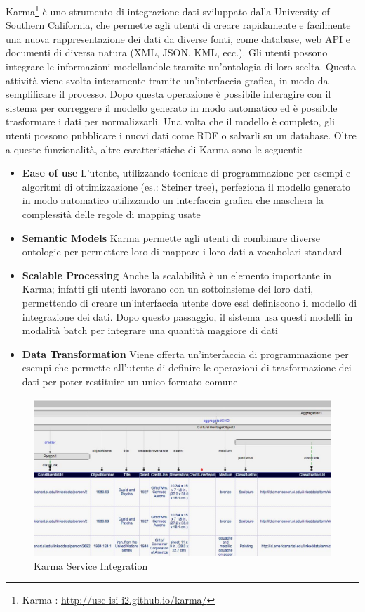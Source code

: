 Karma\footnote{Karma : \url{http://usc-isi-i2.github.io/karma/}} è uno strumento di integrazione dati sviluppato dalla University of Southern California, che permette agli utenti di creare rapidamente e facilmente una nuova rappresentazione dei dati  da diverse fonti, come database, web API e documenti di diversa natura (XML, JSON, KML, ecc.). Gli utenti possono integrare le informazioni modellandole tramite un'ontologia di loro scelta. Questa attività viene svolta interamente tramite un'interfaccia grafica, in modo da semplificare il processo. 
Dopo questa operazione è possibile interagire con il sistema per correggere il modello generato in modo automatico ed è possibile trasformare i dati per normalizzarli. Una volta che il modello è completo, gli utenti possono pubblicare i nuovi dati come RDF o salvarli su un database.
Oltre a queste funzionalità, altre caratteristiche di Karma sono le seguenti: 
\begin{itemize}
	\item \textbf{Ease of use} L'utente, utilizzando tecniche di programmazione per esempi e algoritmi  di ottimizzazione (es.: Steiner tree), perfeziona il modello generato in modo automatico utilizzando un interfaccia grafica che maschera la complessità delle regole di mapping usate
	\item \textbf{Semantic Models} Karma permette agli utenti di combinare diverse ontologie per permettere loro di mappare i loro dati a vocabolari standard
	\item \textbf{Scalable Processing} Anche la scalabilità è un elemento importante in Karma; infatti gli utenti lavorano con un sottoinsieme dei loro dati, permettendo di creare un'interfaccia utente dove essi definiscono il modello di integrazione dei dati. Dopo questo passaggio, il sistema usa questi modelli in modalità batch per integrare una quantità maggiore di dati
	\item \textbf{Data Transformation} Viene offerta un'interfaccia di programmazione per esempi che permette all'utente di definire le operazioni di trasformazione dei dati per poter restituire un unico formato comune
\end{itemize}

\begin{figure}[ht]
	\centering
	\includegraphics[width=\textwidth]{2-nozioni-preliminari/Immagini/karma-europeana.jpg}
	\caption{Karma Service Integration}\label{fig:karma-europeana}
\end{figure}

